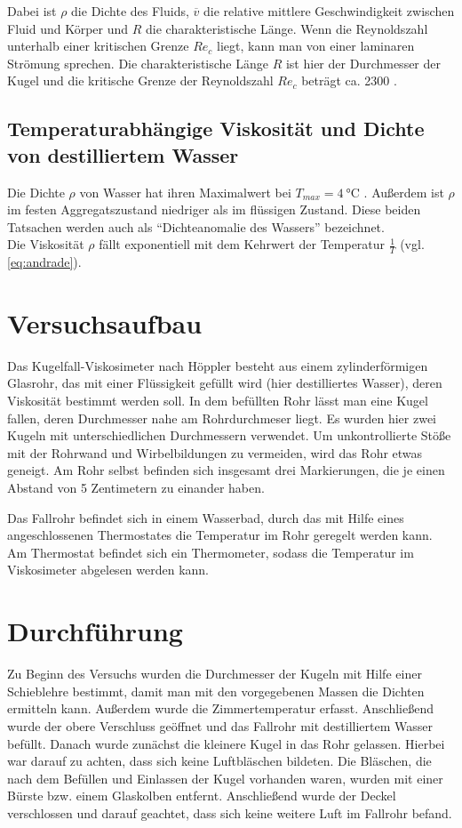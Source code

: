 Dabei ist $\rho$ die Dichte des Fluids, $\overline{v}$ die relative mittlere Geschwindigkeit zwischen Fluid und Körper und
$R$ die charakteristische Länge.
Wenn die Reynoldszahl unterhalb einer kritischen Grenze $Re_c$ liegt, kann man von einer laminaren Strömung sprechen.
Die charakteristische Länge $R$ ist hier der Durchmesser der Kugel und die kritische Grenze der Reynoldszahl $Re_c$ beträgt ca. 2300 \cite*[]{geschke}.


\subsection{Temperaturabhängige Viskosität und Dichte von destilliertem Wasser}
Die Dichte $\rho$ von Wasser hat ihren Maximalwert bei $T_{max} = \qty[]{4}{\degreeCelsius}$ \cite*[]{geschke}.
Außerdem ist $\rho$ im festen Aggregatszustand niedriger als im flüssigen Zustand. 
Diese beiden Tatsachen werden auch als \enquote{Dichteanomalie des Wassers} bezeichnet\cite*[]{demtroeder}.\\
Die Viskosität $\rho$ fällt exponentiell mit dem Kehrwert der Temperatur $\frac{1}{T}$ (vgl. \eqref{eq:andrade}).



\section[]{Versuchsaufbau}
Das Kugelfall-Viskosimeter nach Höppler besteht aus einem zylinderförmigen Glasrohr,
das mit einer Flüssigkeit gefüllt wird (hier destilliertes Wasser), deren Viskosität bestimmt werden soll. 
In dem befüllten Rohr lässt man eine Kugel fallen, deren Durchmesser nahe am Rohrdurchmeser liegt.
Es wurden hier zwei Kugeln mit unterschiedlichen Durchmessern verwendet. 
Um unkontrollierte Stöße mit der Rohrwand und Wirbelbildungen zu vermeiden, wird das Rohr etwas geneigt.
Am Rohr selbst befinden sich insgesamt drei Markierungen, die je einen Abstand von 5 Zentimetern zu einander haben.

Das Fallrohr befindet sich in einem Wasserbad, durch das mit Hilfe eines angeschlossenen Thermostates die Temperatur im Rohr geregelt werden kann.
Am Thermostat befindet sich ein Thermometer, sodass die Temperatur im Viskosimeter abgelesen werden kann.



\section{Durchführung}
Zu Beginn des Versuchs wurden die Durchmesser der Kugeln mit Hilfe einer Schieblehre bestimmt, damit man mit den vorgegebenen Massen die Dichten ermitteln kann.
Außerdem wurde die Zimmertemperatur erfasst.
Anschließend wurde der obere Verschluss geöffnet und das Fallrohr mit destilliertem Wasser befüllt. 
Danach wurde zunächst die kleinere Kugel in das Rohr gelassen.
Hierbei war darauf zu achten, dass sich keine Luftbläschen bildeten.
Die Bläschen, die nach dem Befüllen und Einlassen der Kugel vorhanden waren, wurden mit einer Bürste bzw. einem Glaskolben entfernt.
Anschließend wurde der Deckel verschlossen und darauf geachtet, dass sich keine weitere Luft im Fallrohr befand.

